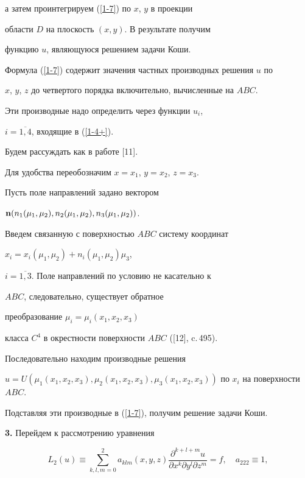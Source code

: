 а затем проинтегрируем (\ref{1-7}) по $x$, $y$ в проекции


области $D$ на плоскость $(x,y)$. В результате получим


функцию $u$, являющуюся решением задачи Коши.





Формула (\ref{1-7}) содержит значения частных производных решения $u$ по


$x$, $y$, $z$ до четвертого порядка включительно, вычисленные на $ABC$.


Эти производные надо определить через функции $u_{i}$,


$i=\overline{1,4}$, входящие в (\ref{1-4+}).


Будем рассуждать как в работе [11].


Для удобства переобозначим $x=x_{1}$, $y=x_{2}$,  $z=x_{3}$.


Пусть поле направлений задано вектором


${\bold n} (n_{1}(\mu_{1},\mu_{2}),n_{2}(\mu_{1},\mu_{2}),


n_{3}(\mu_{1},\mu_{2}))$.


Введем связанную с поверхностью $ABC$ систему координат 


$x_{i}=x_{i}(\mu_{1},\mu_{2})+n_{i}(\mu_{1},\mu_{2})\mu_{3}$,


$i=\overline{1,3}$. Поле направлений по условию не касательно к


$ABC$, следовательно, существует обратное


преобразование $\mu_{i} =\mu_{i} (x_{1},x_{2},x_{3})$


класса $C^{4}$ в окрестности поверхности $ABC$ ([12], c.\,495).


Последовательно находим производные решения


$u=U(\mu_{1}(x_{1},x_{2},x_{3}),\mu_{2}(x_{1},x_{2},x_{3}),


\mu_{3}(x_{1},x_{2},x_{3}))$ по $x_{i}$ на поверхности $ABC$.


Подставляя эти производные в (\ref{1-7}), получим решение задачи Коши.


\medskip





{\bf 3.} Перейдем к рассмотрению уравнения


\begin{equation}\label{2-1}


L_{2}(u)\equiv \sum_{k,l,m=0}^{2} a_{klm}(x,y,z)


\frac{\partial^{k+l+m}u}{\partial x^{k} \partial y^{l} \partial z^{m}}=f,


\quad a_{222}\equiv1,


\end{equation}


